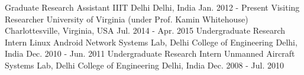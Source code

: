 \begin{cventries}
  \cventry
    {Graduate Research Assistant}
    {IIIT Delhi}
    {Delhi, India}
    {Jan. 2012 - Present}
    {}
  \cventry
    {Visiting Researcher}
    {University of Virginia (under Prof. Kamin Whitehouse)}
    {Charlottesville, Virginia, USA}
    {Jul. 2014 - Apr. 2015}
    {}
  \cventry
    {Undergraduate Research Intern}
    {Linux Android Network Systems Lab, Delhi College of Engineering}
    {Delhi, India}
    {Dec. 2010 - Jun. 2011}
    {}
  \cventry
    {Undergraduate Research Intern}
    {Unmanned Aircraft Systems Lab, Delhi College of Engineering}
    {Delhi, India}
    {Dec. 2008 - Jul. 2010}
    {}
 
  
\end{cventries}
